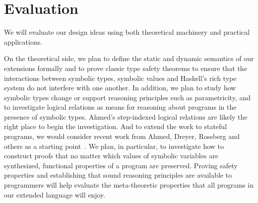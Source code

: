 











\section{Evaluation}
\label{sec:eval}

We will evaluate our design ideas using both theoretical machinery and
practical applications.

On the theoretical side, we plan to define the 
static and dynamic semantics of our extensions formally and 
to prove classic type safety theorems to ensure that the interactions
between symbolic types, symbolic values and Haskell's rich type system
do not interfere with one another.  In addition, we plan to study
how symbolic types change or support reasoning principles such as
parametricity, and to investigate logical relations as means
for reasoning about programs in the presence of symbolic types.  
Ahmed's step-indexed logical relations are likely the right place
to begin the investigation.  And to extend the work to stateful programs,
we would consider recent work from Ahmed, Dreyer, Rossberg and others 
as a starting
point~\cite{Ahmed:state-logical-relations,Dreyer:logical-relations}.
We plan, in particular, to investigate how to construct proofs that
no matter which values of symbolic variables are synthesized, functional
properties of a program are preserved.
Proving safety properties and establishing that sound reasoning principles
are available to programmers will help evaluate the meta-theoretic
properties that all programs in our extended language will enjoy.

